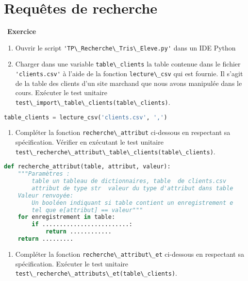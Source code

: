 \documentclass[
  11pt,
]{article}
\newcommand{\passthrough}[1]{#1}
\providecommand{\tightlist}{%
  \setlength{\itemsep}{0pt}\setlength{\parskip}{0pt}}
\newcounter{exo}
\newenvironment{exercice}[1]
{\par \medskip   \addtocounter{exo}{1} \noindent  
\begin{bclogo}[arrondi =0.1,   noborder = true, logo=\bccrayon, marge=4]{~\textbf{Exercice} \textbf{\theexo} {\itshape #1} }  \par}
{
\end{bclogo}
 \par \bigskip }
\newcounter{def}
\newcounter{cours}
\begin{document}
\hypertarget{requuxeates-de-recherche}{%
\section{Requêtes de recherche}\label{requuxeates-de-recherche}}

\begin{exercice}{}

\begin{enumerate}
\def\labelenumi{\arabic{enumi}.}
\tightlist
\item
  Ouvrir le script
  \passthrough{\lstinline!'TP\_Recherche\_Tris\_Eleve.py'!} dans un IDE
  Python
\item
  Charger dans une variable \passthrough{\lstinline!table\_clients!} la
  table contenue dans le fichier \passthrough{\lstinline!'clients.csv'!}
  à l'aide de la fonction \passthrough{\lstinline!lecture\_csv!} qui est
  fournie. Il s'agit de la table des clients d'un site marchand que nous
  avons manipulée dans le cours. Exécuter le test unitaire
  \passthrough{\lstinline!test\_import\_table\_clients(table\_clients)!}.
\end{enumerate}

\begin{lstlisting}[language=Python]
table_clients = lecture_csv('clients.csv', ',')
\end{lstlisting}

\begin{enumerate}
\def\labelenumi{\arabic{enumi}.}
\setcounter{enumi}{2}
\tightlist
\item
  Compléter la fonction \passthrough{\lstinline!recherche\_attribut!}
  ci-dessous en respectant sa spécification. Vérifier en exécutant le
  test unitaire
  \passthrough{\lstinline!test\_recherche\_attribut\_table\_clients(table\_clients)!}.
\end{enumerate}

\begin{lstlisting}[language=Python]
def recherche_attribut(table, attribut, valeur):
    """Paramètres : 
        table un tableau de dictionnaires, table  de clients.csv
        attribut de type str  valeur du type d'attribut dans table
    Valeur renvoyée:
        Un booléen indiquant si table contient un enregistrement e
        tel que e[attribut] == valeur"""
    for enregistrement in table:
        if .........................:
            return ............
    return .........
\end{lstlisting}

\begin{enumerate}
\def\labelenumi{\arabic{enumi}.}
\setcounter{enumi}{3}
\tightlist
\item
  Compléter la fonction
  \passthrough{\lstinline!recherche\_attribut\_et!} ci-dessous en
  respectant sa spécification. Exécuter le test unitaire
  \passthrough{\lstinline!test\_recherche\_attributs\_et(table\_clients)!}.
\end{enumerate}


\end{exercice}
\end{document}
